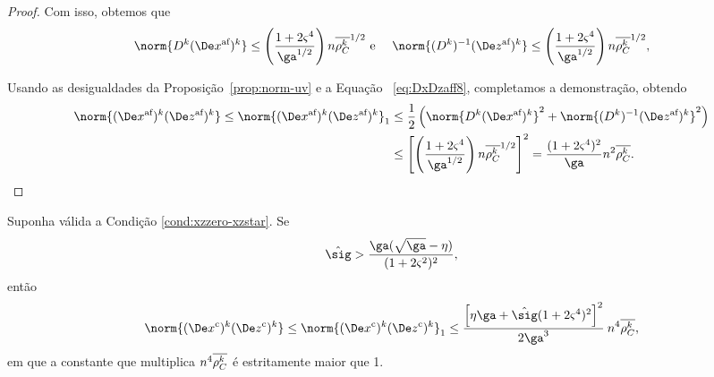 \begin{proof}
Com isso, obtemos que 
	\begin{equation}\label{eq:DxDzaff8}
		\norm{\Dk  \dekx }\leq \left(\frac{1 + 2\bdxzstar^{4} }{\ga^{1/2}}\right) n\rhoCkb ^{1/2}\text{ e } \quad  \norm{\Dik  \dekz  }\leq \left(\frac{1 + 2\bdxzstar^{4} }{\ga^{1/2}}\right)n\rhoCkb ^{1/2},
		\end{equation}




Usando as desigualdades da Proposição~\ref{prop:norm-uv} e  a Equação ~\eqref{eq:DxDzaff8}, completamos a demonstração, obtendo 
\begin{align}
	\norm{ \dekx  \dekz  } \leq \norm{ \dekx  \dekz  }_{1}   & \leq \frac{1}{2}\left(\norm{\Dk \dekx}^{2} + \norm{\Dik  \dekz  }^{2}\right) \notag
  					\\ 
  					& \leq \left[\left(\frac{1 + 2\bdxzstar^{4} }{\ga^{1/2}}\right)  n\rhoCkb ^{1/2}\right]^{2}
  				= \frac{(1 + 2\bdxzstar^{4})^{2} }{\ga} n^{2}\rhoCkb . \qedhere
  				 \label{eq:normDxDzaff}
\end{align}

\end{proof}

\begin{lema}\label{lemma:boundDxDzc}
Suponha válida a Condição  \ref{cond:xzzero-xzstar}. Se  \begin{equation}
	\label{eq:sig-eta-relation}
	\nextsig > \frac{\ga(\sqrt{\ga} - \eta)}{(1+2\bdxzstar^{2})^{2}},
\end{equation} então  
	\begin{equation}\label{eq:lemma-boundDxDzcx}
		\norm{ \Dekcox  \Dekcoz  } \leq \norm{ \Dekcox  \Dekcoz  }_{1} \leq \dfrac{\left[\eta\ga + \nextsig(1+2\bdxzstar^{4})^{2}\right]^{2}}{2\ga^{3}} \: n^{4}\rhoCkb ,
	\end{equation}
	em que a constante que multiplica $n^{4}\overline{\rho_C^{k}}$ é estritamente maior que \num{1}.
\end{lema}



